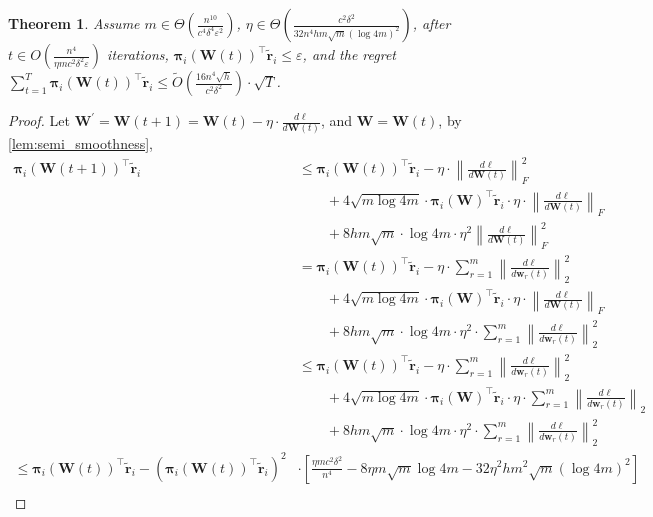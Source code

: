 \documentclass[10pt]{article}
\def\rvw{{\mathbf{w}}}
\def\rvtilder{{\tilde{\mathbf{r}}}}
\newtheorem{thm}{Theorem}
\def\rvpi{{\boldsymbol{\pi}}}
\def\rmW{{\mathbf{W}}}
\begin{document}
\begin{thm}
    Assume $m \in \Theta\left( \frac{n^{10}}{c^4 \delta^4 \varepsilon^2} \right)$, $\eta \in \Theta\left( \frac{c^2 \delta^2}{32 n^4 h m \sqrt{m} \left( \log{4m} \right)^2} \right)$, after $t \in O\left( \frac{n^4}{\eta m c^2 \delta^2 \varepsilon} \right)$ iterations, $\rvpi_i\left( \rmW(t) \right)^\top \rvtilder_i \le \varepsilon$, and the regret $\sum\limits_{t=1}^{T}{ \rvpi_i\left( \rmW(t) \right)^\top \rvtilder_i } \le  \tilde{O}\left(\frac{16 n^4 \sqrt{h}}{c^2 \delta^2}\right) \cdot \sqrt{T}$.
\end{thm}
\begin{proof}
    Let $\rmW^\prime = \rmW(t+1) = \rmW(t) - \eta \cdot \frac{d \ell}{d \rmW(t)}$, and $\rmW = \rmW(t)$, by \cref{lem:semi_smoothness},
\begin{equation*}
\begin{split}
    \rvpi_i\left( \rmW(t+1) \right)^\top \rvtilder_i &\le \rvpi_i\left( \rmW(t) \right)^\top \rvtilder_i - \eta \cdot \left\| \frac{d \ell}{d \rmW(t)} \right\|_F^2 \\
    &\qquad + 4 \sqrt{m \log{4m}} \cdot \rvpi_i\left( \rmW \right)^\top \rvtilder_i \cdot \eta \cdot \left\| \frac{d \ell}{d \rmW(t)} \right\|_F \\
    &\qquad + 8 h m \sqrt{m } \cdot \log{4m} \cdot \eta^2 \left\| \frac{d \ell}{d \rmW(t)} \right\|_F^2 \\
    &= \rvpi_i\left( \rmW(t) \right)^\top \rvtilder_i - \eta \cdot \sum\limits_{r=1}^{m}{ \left\| \frac{d\ell}{d \rvw_r(t)} \right\|_2^2 } \\
    &\qquad + 4 \sqrt{m \log{4m}} \cdot \rvpi_i\left( \rmW \right)^\top \rvtilder_i \cdot \eta \cdot \left\| \frac{d \ell}{d \rmW(t)} \right\|_F \\
    &\qquad + 8 h m \sqrt{m } \cdot \log{4m} \cdot \eta^2 \cdot \sum\limits_{r=1}^{m}{ \left\| \frac{d\ell}{d \rvw_r(t)} \right\|_2^2 } \\
    &\le \rvpi_i\left( \rmW(t) \right)^\top \rvtilder_i - \eta \cdot \sum\limits_{r=1}^{m}{ \left\| \frac{d\ell}{d \rvw_r(t)} \right\|_2^2 } \\
    &\qquad + 4 \sqrt{m \log{4m}} \cdot \rvpi_i\left( \rmW \right)^\top \rvtilder_i \cdot \eta \cdot \sum\limits_{r=1}^{m}{ \left\| \frac{d\ell}{d \rvw_r(t)} \right\|_2 } \\
    &\qquad + 8 h m \sqrt{m } \cdot \log{4m} \cdot \eta^2 \cdot \sum\limits_{r=1}^{m}{ \left\| \frac{d\ell}{d \rvw_r(t)} \right\|_2^2 } \\
    \le \rvpi_i\left( \rmW(t) \right)^\top \rvtilder_i - \left( \rvpi_i\left( \rmW(t) \right)^\top \rvtilder_i \right)^2 &\cdot \left[ \frac{\eta m c^2 \delta^2}{n^4} - 8 \eta m \sqrt{m} \log{4m} - 32 \eta^2 h m^2 \sqrt{m} \left( \log{4m} \right)^2 \right] \\

\end{split}
\end{equation*}
\end{proof}
\end{document}

